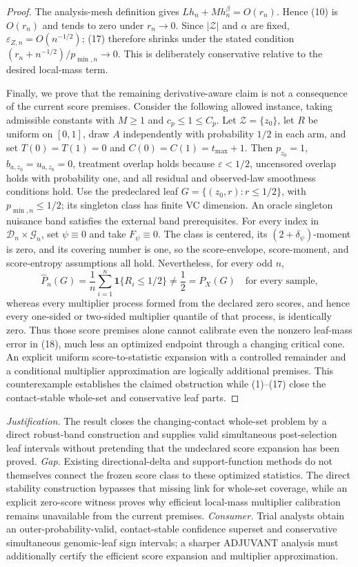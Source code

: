 \documentclass{article}
\begin{document}
\begin{proof}
The analysis-mesh definition gives \(Lh_n+Mh_n^\beta=O(r_n)\).  Hence (10) is \(O(r_n)\) and tends to zero under \(r_n\to0\).  Since \(|\mathcal Z|\) and \(\alpha\) are fixed, \(\varepsilon_{Z,n}=O(n^{-1/2})\); (17) therefore shrinks under the stated condition \((r_n+n^{-1/2})/p_{\min,n}\to0\).  This is deliberately conservative relative to the desired local-mass term.

Finally, we prove that the remaining derivative-aware claim is not a consequence of the current score premises.  Consider the following allowed instance, taking admissible constants with \(M\geq1\) and \(c_p\leq1\leq C_p\).  Let \(\mathcal Z=\{z_0\}\), let \(R\) be uniform on \([0,1]\), draw \(A\) independently with probability \(1/2\) in each arm, and set \(T(0)=T(1)=0\) and \(C(0)=C(1)=t_{\max}+1\).  Then \(p_{z_0}=1\), \(b_{a,z_0}=u_{a,z_0}=0\), treatment overlap holds because \(\varepsilon<1/2\), uncensored overlap holds with probability one, and all residual and observed-law smoothness conditions hold.  Use the predeclared leaf \(G=\{(z_0,r):r\leq1/2\}\), with \(p_{\min,n}\leq1/2\); its singleton class has finite VC dimension.  An oracle singleton nuisance band satisfies the external band prerequisites.  For every index in \(\mathcal D_n\times\mathcal G_n\), set \(\psi\equiv0\) and take \(F_\psi\equiv0\).  The class is centered, its \((2+\delta_\psi)\)-moment is zero, and its covering number is one, so the score-envelope, score-moment, and score-entropy assumptions all hold.  Nevertheless, for every odd \(n\),
\[
\widehat P_n(G)=\frac1n\sum_{i=1}^n\mathbf1\{R_i\leq1/2\}\neq\frac12=P_X(G)
\quad\text{for every sample},
\tag{18}
\]
whereas every multiplier process formed from the declared zero scores, and hence every one-sided or two-sided multiplier quantile of that process, is identically zero.  Thus those score premises alone cannot calibrate even the nonzero leaf-mass error in (18), much less an optimized endpoint through a changing critical cone.  An explicit uniform score-to-statistic expansion with a controlled remainder and a conditional multiplier approximation are logically additional premises.  This counterexample establishes the claimed obstruction while (1)--(17) close the contact-stable whole-set and conservative leaf parts.
\end{proof}
\par\smallskip\noindent \textit{Justification.} The result closes the changing-contact whole-set problem by a direct robust-band construction and supplies valid simultaneous post-selection leaf intervals without pretending that the undeclared score expansion has been proved. \textit{Gap.} Existing directional-delta and support-function methods do not themselves connect the frozen score class to these optimized statistics. The direct stability construction bypasses that missing link for whole-set coverage, while an explicit zero-score witness proves why efficient local-mass multiplier calibration remains unavailable from the current premises. \textit{Consumer.} Trial analysts obtain an outer-probability-valid, contact-stable confidence superset and conservative simultaneous genomic-leaf sign intervals; a sharper ADJUVANT analysis must additionally certify the efficient score expansion and multiplier approximation.
\end{document}
